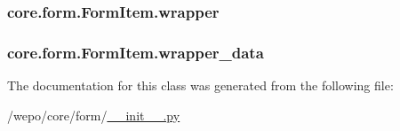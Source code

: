\hypertarget{classcore_1_1form_1_1FormItem_abb7070a9b42088942be433eb6c72c8c1}{
\subsubsection[{wrapper}]{\setlength{\rightskip}{0pt plus 5cm}core.\-form.\-Form\-Item.\-wrapper}}\label{classcore_1_1form_1_1FormItem_abb7070a9b42088942be433eb6c72c8c1}
\hypertarget{classcore_1_1form_1_1FormItem_aad1d579ea8f49cf80edda2b91fef7335}{
\subsubsection[{wrapper\-\_\-data}]{\setlength{\rightskip}{0pt plus 5cm}core.\-form.\-Form\-Item.\-wrapper\-\_\-data}}\label{classcore_1_1form_1_1FormItem_aad1d579ea8f49cf80edda2b91fef7335}


The documentation for this class was generated from the following file\-:\begin{DoxyCompactItemize}
\item 
/wepo/core/form/\hyperlink{core_2form_2____init_____8py}{\-\_\-\-\_\-init\-\_\-\-\_\-.\-py}\end{DoxyCompactItemize}

